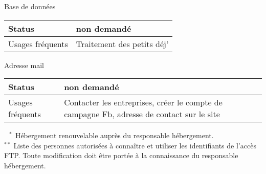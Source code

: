 \documentclass{../ki019}
\newenvironment{tableau}[1]{
\LARGE #1\\
\vspace{0.4cm}
\begin{tabular}{|K{5cm}|K{10cm}|}
}
{
\end{tabular}
\vspace{0.5cm}
}
\begin{document}
\begin{center}
\begin{tableau}{Base de données}
\hline
Status & non demandé \\
\hline
Usages fréquents & Traitement des petits déj' \\
\hline
\end{tableau}

\begin{tableau}{Adresse mail}
\hline
Status & non demandé \\
\hline
Usages fréquents & Contacter les entreprises, créer le compte de campagne Fb, adresse de contact sur le site \\
\hline
\end{tableau}

\end{center}

\Large \noindent
$^{\phantom{*}*}$ Hébergement renouvelable auprès du responsable hébergement. \\
$^{**}$ Liste des personnes autorisées à connaître et utiliser les identifiants de l'accès FTP. Toute modification doit être portée à la connaissance du responsable hébergement.

\Footer
\end{document}

